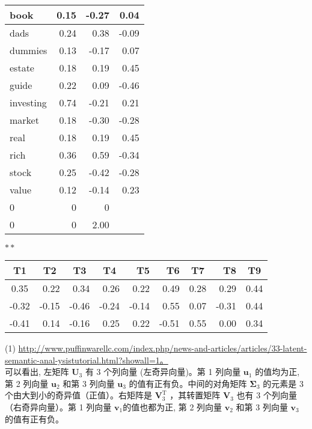 \documentclass[10pt]{article}
\begin{document}
\begin{center}
\begin{tabular}{|l|r|r|r|}
\hline
book & 0.15 & -0.27 & 0.04 \\
\hline
dads & 0.24 & 0.38 & -0.09 \\
\hline
dummies & 0.13 & -0.17 & 0.07 \\
\hline
estate & 0.18 & 0.19 & 0.45 \\
\hline
guide & 0.22 & 0.09 & -0.46 \\
\hline
investing & 0.74 & -0.21 & 0.21 \\
\hline
market & 0.18 & -0.30 & -0.28 \\
\hline
real & 0.18 & 0.19 & 0.45 \\
\hline
rich & 0.36 & 0.59 & -0.34 \\
\hline
stock & 0.25 & -0.42 & -0.28 \\
\hline
value & 0.12 & -0.14 & 0.23 \\
\hline
0 & 0 & 0 &  \\
\hline
0 & 0 & 2.00 &  \\
\hline
\end{tabular}
\end{center}$* *$

\begin{center}
\begin{tabular}{|c|r|r|r|r|r|c|r|c|}
\hline
T1 & \multicolumn{1}{|c|}{T2} & \multicolumn{1}{c|}{T3} & \multicolumn{1}{c|}{T4} & T5 & T6 & T7 & T8 & T9 \\
\hline
0.35 & 0.22 & 0.34 & 0.26 & 0.22 & 0.49 & 0.28 & 0.29 & 0.44 \\
\hline
-0.32 & -0.15 & -0.46 & -0.24 & -0.14 & 0.55 & 0.07 & -0.31 & 0.44 \\
\hline
-0.41 & 0.14 & -0.16 & 0.25 & 0.22 & -0.51 & 0.55 & 0.00 & 0.34 \\
\hline
\end{tabular}
\end{center}

(1) \href{http://www.puffinwarellc.com/index.php/news-and-articles/articles/33-latent-semantic-anal-ysistutorial.html?showall=1%E3%80%82}{http://www.puffinwarellc.com/index.php/news-and-articles/articles/33-latent-semantic-anal-ysistutorial.html?showall=1。}\\
可以看出, 左矩阵 $\boldsymbol{U}_{3}$ 有 3 个列向量 (左奇异向量)。第 1 列向量 $\boldsymbol{u}_{1}$ 的值均为正, 第 2 列向量 $\boldsymbol{u}_{2}$ 和第 3 列向量 $\boldsymbol{u}_{3}$ 的值有正有负。中间的对角矩阵 $\boldsymbol{\Sigma}_{3}$ 的元素是 3 个由大到小的奇异值（正值）。右矩阵是 $\boldsymbol{V}_{3}^{\mathrm{T}}$ ，其转置矩阵 $\boldsymbol{V}_{3}$ 也有 3 个列向量（右奇异向量）。第 1 列向量 $\boldsymbol{v}_{1}$的值也都为正, 第 2 列向量 $\boldsymbol{v}_{2}$ 和第 3 列向量 $\boldsymbol{v}_{3}$ 的值有正有负。
\end{document}
